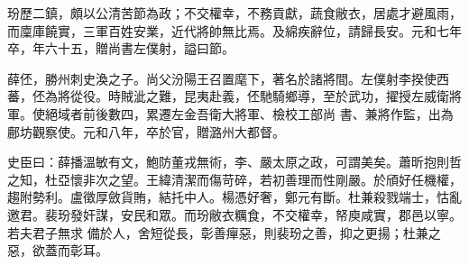 \begin{pinyinscope}
 玢歷二鎮，頗以公清苦節為政；不交權幸，不務貢獻，蔬食敝衣，居處才避風雨，而廩庫饒實，三軍百姓安業，近代將帥無比焉。及綿疾辭位，請歸長安。元和七年卒，年六十五，贈尚書左僕射，謚曰節。



 薛伾，勝州刺史渙之子。尚父汾陽王召置麾下，著名於諸將間。左僕射李揆使西蕃，伾為將從役。時賊泚之難，昆夷赴義，伾馳騎鄉導，至於武功，擢授左威衛將軍。使絕域者前後數四，累遷左金吾衛大將軍、檢校工部尚
 書、兼將作監，出為鄜坊觀察使。元和八年，卒於官，贈潞州大都督。



 史臣曰：薛播溫敏有文，鮑防董戎無術，李、嚴太原之政，可謂美矣。蕭昕抱則哲之知，杜亞懷非次之望。王緯清潔而傷苛碎，若初善理而性剛嚴。於頎好任機權，趨附勢利。盧徵厚斂貨賄，結托中人。楊憑好奢，鄭元有斷。杜兼殺戮端士，怙亂邀君。裴玢發奸謀，安民和眾。而玢敝衣糲食，不交權幸，帑庾咸實，郡邑以寧。若夫君子無求
 備於人，舍短從長，彰善癉惡，則裴玢之善，抑之更揚；杜兼之惡，欲蓋而彰耳。



\end{pinyinscope}